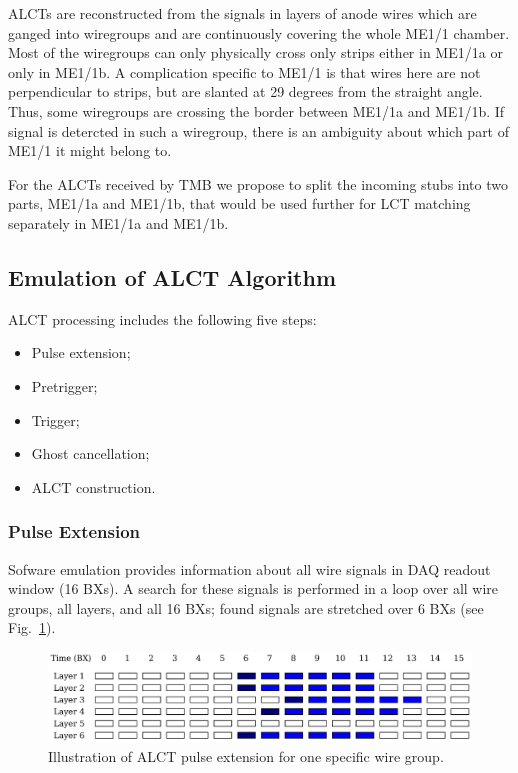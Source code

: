 ALCTs are reconstructed from the signals in layers of anode wires which are ganged into wiregroups and are continuously covering the whole ME1/1 chamber. Most of the wiregroups can only physically cross only strips either in ME1/1a or only in ME1/1b. A complication specific to ME1/1 is that wires here are not perpendicular to strips, but are slanted at 29 degrees from the straight angle. Thus, some wiregroups are crossing the border between ME1/1a and ME1/1b. If signal is detercted in such a wiregroup, there is an ambiguity about which part of ME1/1 it might belong to.

For the ALCTs received by TMB we propose to split the incoming stubs into two parts, ME1/1a and ME1/1b, that would be used further for LCT matching separately in ME1/1a and ME1/1b. 




\subsection{Emulation of ALCT Algorithm}
\label{subsec:alct_emulation}

ALCT processing includes the following five steps:

\begin{itemize}
    \item Pulse extension;
    \item Pretrigger;
    \item Trigger;
    \item Ghost cancellation;
    \item ALCT construction.
\end{itemize}

\subsubsection{Pulse Extension}

Sofware emulation provides information about all wire signals in DAQ readout window (16 BXs). A search for these signals is performed in a loop over all wire groups, all layers, and all 16 BXs; found signals are stretched over 6 BXs (see Fig.~\ref{fig:alct_pulse_extension}).

\begin{figure}[tbh]
        \begin{center}
                \includegraphics[width=0.9\linewidth]{figures/stretched_hits_alct.pdf}
                \caption{Illustration of ALCT pulse extension for one specific wire group.}
                \label{fig:alct_pulse_extension}
        \end{center}
\end{figure}

